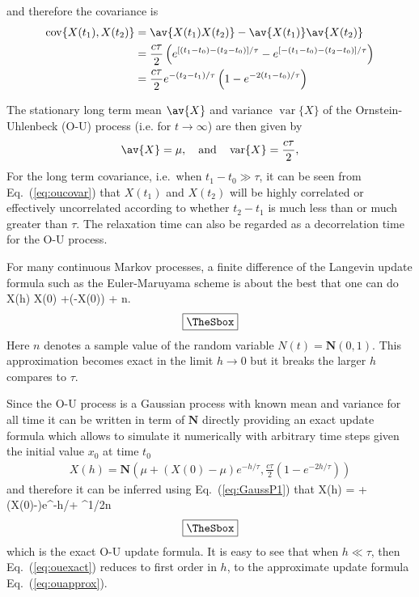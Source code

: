 \documentclass[10pt,a4paper]{article}
\newcommand{\eq}[1]{Eq.~(\ref{#1})}
\newcommand{\gaussian}{\ensuremath{\mathbf{N}}}
\newcommand{\var}[1]{\ensuremath{\mathop{\mathrm{var}}\{#1\}}}
\newcommand{\cov}[1]{\ensuremath{\mathop{\mathrm{cov}}\{#1\}}}
\newcommand{\OU}{\renewcommand{\OU}{O-U\xspace}Ornstein-Uhlenbeck (O-U)\xspace}
\newlength{\mylength}
\newenvironment{falign}%
{\setlength{\fboxsep}{5pt}
\setlength{\fboxrule}{0.5pt}
\setlength{\mylength}{\textwidth}
\addtolength{\mylength}{-2\fboxsep}
\addtolength{\mylength}{-2\fboxrule}
\Sbox
\minipage{\mylength}%
	\setlength{\abovedisplayskip}{-2\lineskip}
	\setlength{\belowdisplayskip}{-2\lineskip}
\align}%
{\endalign\endminipage\endSbox
\[\fbox{\TheSbox}\]}
\begin{document}
and therefore the covariance is
\begin{align}
\cov{X(t_1),X(t_2)} & = \av{X(t_1)X(t_2)}-\av{X(t_1)}\av{X(t_2)} \\
& =  \frac{c\tau}{2}
\left(e^{[(t_1{-}t_0)-(t_2{-}t_0)]/\tau}-
e^{[-(t_1{-}t_0)-(t_2{-}t_0)]/\tau}\right)\\
& = \frac{c\tau}{2}e^{-(t_2-t_1)/\tau}\left(1-e^{-2(t_1-t_0)/\tau}\right)
\label{eq:oucovar}
\end{align}

The stationary long term mean $\av{X}$ and variance $\var{X}$
of the \OU process (i.e. for $t\rightarrow\infty$) are then given by
\begin{align}
\av{X}  = \mu, \quad\text{and}\quad \var{X}  = \frac{c\tau}{2}, 
\end{align}
For the long term covariance, i.e.\ when $t_1{-}t_0\gg\tau$, it can be seen
from \eq{eq:oucovar} that $X(t_1)$ and $X(t_2)$ will be highly correlated or
effectively uncorrelated according to whether $t_2{-}t_1$ is much less than
or much greater than $\tau$. The relaxation time can also be regarded as a
decorrelation time for the \OU process.

For many continuous Markov processes, a finite difference of the Langevin
update formula such as the Euler-Maruyama scheme is about the best that one
can do 
\begin{falign}
X(h) \approx X(0) +\left(\mu-X(0)\right) + n.
\label{eq:ouapprox}
\end{falign}
Here $n$ denotes a sample value of the random variable $N(t)=\gaussian(0,1)$.
This approximation becomes exact in the limit $h\rightarrow0$ but
it breaks the larger $h$ compares to $\tau$.

Since the \OU process is a Gaussian process with known mean and variance for
all time it can be written in term of $\gaussian$ directly 
providing an exact update formula which allows
to simulate it numerically with arbitrary time steps given the initial value
$x_0$ at time $t_0$ \citep{gillespie:1996a,gillespie:1996b}
\begin{align}
X(h) = \gaussian\left(\mu+(X(0)-\mu)e^{-h/\tau},
\frac{c\tau}{2}\left(1-e^{-2h/\tau}\right)\right)
\end{align}
and therefore it can be inferred using \eq{eq:GaussP1} that
\begin{falign}
X(h) = \mu+\left(X(0)-\mu\right)e^{-h/\tau}+
^{1/2}n
\label{eq:ouexact}
\end{falign}
which is the exact \OU update formula. It is easy to see that when
$h\ll\tau$, then \eq{eq:ouexact} reduces to first order in $h$, to the
approximate update formula \eq{eq:ouapprox}.
\end{document}
